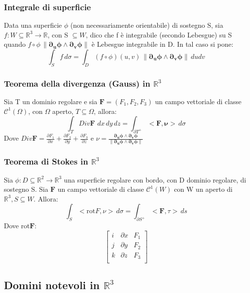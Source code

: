 \documentclass{article} %
\begin{document}
    \subsubsection*{Integrale di superficie}
    Data una superficie $\phi$ (non necessariamente orientabile) di sostegno S, sia $f: W \subseteq \mathbb{R}^3 \to \mathbb{R}$, con S $\subseteq W$, dico che f è integrabile (secondo Lebesgue) su S quando $f \circ \phi \, \lVert \mathbf{ \partial_u \phi \wedge \partial_v \phi} \rVert$ è Lebesgue integrabile in D. In tal caso si pone: 
    $$\int_S f \, d \sigma = \int_D (f \circ \phi) (u,v) \, \lVert \mathbf{ \partial_u \phi \wedge \partial_v \phi} \rVert \, du dv $$

    \subsubsection*{Teorema della divergenza (Gauss) in $\mathbb{R}^3$}
    Sia T un dominio regolare e sia $\mathbf{F}=(F_1, F_2, F_3)$ un campo vettoriale di classe $\mathcal{C}^1(\Omega)$, con $\Omega$ aperto, $T \subseteq \Omega$, allora:
    $$\int_T Div \mathbf{F} \,\, dx \, dy \, dz = \int_{\partial T^+} <\mathbf{F}, \mathbf{\nu}> \, d\sigma$$
    Dove $ Div \mathbf{F} = \frac{\partial F_1}{\partial x} + \frac{\partial F_2}{\partial y} + \frac{\partial F_3}{\partial z}$ e $\nu = \frac{ \mathbf{ \partial_u \phi \wedge \partial_v \phi}}{\lVert \mathbf{ \partial_u \phi \wedge \partial_v \phi} \rVert}$

    \subsubsection*{Teorema di Stokes in $\mathbb{R}^3$}
    Sia $\phi:D \subseteq \mathbb{R}^2 \to \mathbb{R}^3$ una superficie regolare con bordo, con D dominio regolare, di sostegno S. Sia $\mathbf{F}$ un campo vettoriale di classe $\mathcal{C}^1(W)$ con W un aperto di $\mathbb{R}^3, S \subseteq W$. Allora:
    $$\int_S < \text{rot}F, \nu> \, d \sigma = \int_{\partial S^+} < \mathbf{F} , \tau > \, ds$$
    Dove rot$\mathbf{F}$:
    $$\begin{bmatrix}
        i & \partial x & F_1\\
        j & \partial y & F_2 \\
        k & \partial z & F_3 \\
    \end{bmatrix}$$

    \subsection{Domini notevoli in $\mathbb{R}^3$}
\end{document}
